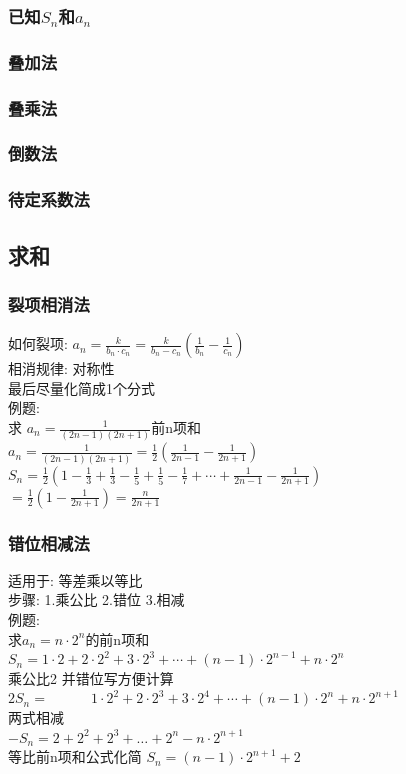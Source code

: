 \documentclass[hyperref, UTF8,11pt,a4paper]{ctexart} %
\begin{document}
\subsubsection{已知$S_{n}$和$a_{n}$}
\subsubsection{叠加法}
\subsubsection{叠乘法}
\subsubsection{倒数法}
\subsubsection{待定系数法}
\subsection{求和}
\subsubsection{裂项相消法}
如何裂项: $a_{n}=\frac{k}{b_{n} \cdot c_{n}}=\frac{k}{b_{n}-c_{n}}\left(\frac{1}{b_{n}}-\frac{1}{c_{n}}\right)$ \\
相消规律: 对称性 \\
最后尽量化简成1个分式 \\
例题: \\
{\color{red}求 $a_{n}=\frac{1}{(2 n-1)(2 n+1)}$前n项和 }\\
$a_{n}=\frac{1}{(2 n-1)(2 n+1)}=\frac{1}{2}\left(\frac{1}{2 n-1}-\frac{1}{2 n+1}\right)$ \\
$S_{n}=\frac{1}{2}\left(1-\frac{1}{3}+\frac{1}{3}-\frac{1}{5}+\frac{1}{5}-\frac{1}{7}+\cdots+\frac{1}{2 n-1}-\frac{1}{2 n+1}\right)$ \\
$=\frac{1}{2}\left(1-\frac{1}{2 n+1}\right)=\frac{n}{2 n+1}$ \\
\subsubsection{错位相减法}
适用于: 等差乘以等比 \\
步骤: 1.乘公比 2.错位 3.相减 \\
例题: \\
{\color{red} 求$a_{n}=n \cdot 2^{n}$的前n项和 }\\
$S_{n} =1 \cdot 2+2 \cdot 2^{2}+3 \cdot 2^{3}+\cdots+(n-1) \cdot 2^{n-1}+n \cdot 2^{n}$ \\
乘公比2 并错位写方便计算\\
$2 S_{n}=\qquad \quad 1 \cdot 2^{2}+2 \cdot 2^{3}+3 \cdot 2^{4}+\cdots+(n-1) \cdot 2^{n}+n \cdot 2^{n+1}$ \\
两式相减 \\
$-S_{n}=2+2^{2}+2^{3}+\dots+2^{n}-n \cdot 2^{n+1}$ \\
等比前n项和公式化简
$S_{n}=(n-1) \cdot 2^{n+1}+2$
\end{document}
